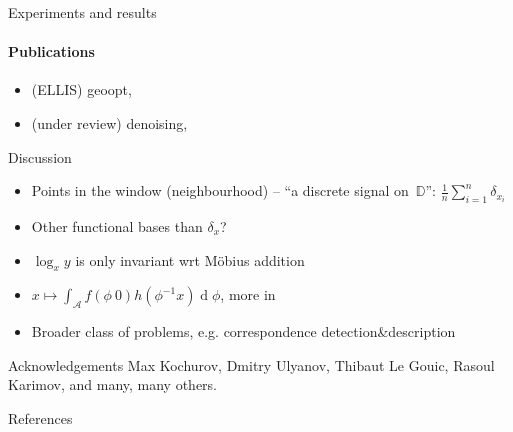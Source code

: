 \documentclass{beamer}
\begin{document}
\begin{frame}{Experiments and results}
    \framesubtitle{Publications}
    
    \begin{itemize}
        \item (ELLIS) geoopt,~\citet{geoopt}
        \item (under review) denoising,~\citet{denoisingAkhmedkhan}
    \end{itemize}
\end{frame}

\begin{frame}{Discussion}
    \begin{itemize}
        \item Points in the window (neighbourhood) -- ``a discrete signal on~\( \mathbb{D} \)'':
            \( \frac1n \sum_{i=1}^n \delta_{x_i} \)
        \item Other functional bases than \( \delta_x \)?~\cite{stollharmonic}
        \item \( \log_xy \) is only invariant wrt M\"obius addition
        \item \(x\mapsto \int_{\mathcal{A}} f(\phi~0) h(\phi^{-1}x) \operatorname{d}\phi \),
            more in~\cite{stollharmonic}
        \item Broader class of problems, e.g. correspondence detection\&description
    \end{itemize}
\end{frame}

\begin{frame}{Acknowledgements}
    Max Kochurov, Dmitry Ulyanov, Thibaut Le Gouic, Rasoul Karimov, and many,
    many others.
\end{frame}

\begin{frame}{References}
    \printbibliography
\end{frame}
\end{document}
